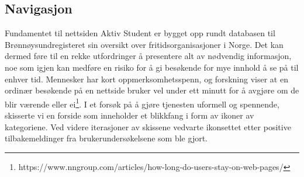 \newpage
\subsection{Navigasjon}

Fundamentet til nettsiden Aktiv Student er bygget opp rundt databasen til Brønnøysundregisteret sin oversikt over fritidsorganisasjoner i Norge. Det kan dermed føre til en rekke utfordringer å presentere alt av nødvendig informasjon, noe som igjen kan medføre en risiko for å gi besøkende for mye innhold å se på til enhver tid.
\vspace{5mm}
Mennesker har kort oppmerksomhetsspenn, og forskning viser at en ordinær besøkende på en nettside bruker vel under ett minutt for å avgjøre om de blir værende eller ei\footnote{https://www.nngroup.com/articles/how-long-do-users-stay-on-web-pages/}. I et forsøk på å gjøre tjenesten uformell og spennende, skisserte vi en forside som inneholder et blikkfang i form av ikoner av kategoriene. Ved videre iterasjoner av skissene vedvarte ikonsettet etter positive tilbakemeldinger fra brukerundersøkelsene som ble gjort.

